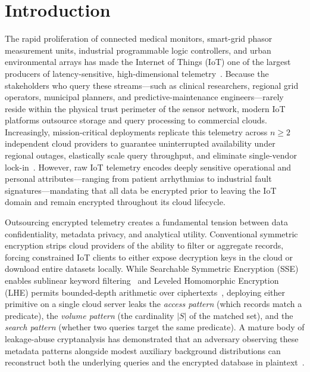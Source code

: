 \documentclass[11pt,a4paper]{article}
\begin{document}
\section{Introduction}

The rapid proliferation of connected medical monitors, smart-grid phasor measurement units, industrial programmable logic controllers, and urban environmental arrays has made the Internet of Things (IoT) one of the largest producers of latency-sensitive, high-dimensional telemetry~\cite{atzori2010}. Because the stakeholders who query these streams---such as clinical researchers, regional grid operators, municipal planners, and predictive-maintenance engineers---rarely reside within the physical trust perimeter of the sensor network, modern IoT platforms outsource storage and query processing to commercial clouds. Increasingly, mission-critical deployments replicate this telemetry across $n \ge 2$ independent cloud providers to guarantee uninterrupted availability under regional outages, elastically scale query throughput, and eliminate single-vendor lock-in~\cite{petcu2013,grozev2014}. However, raw IoT telemetry encodes deeply sensitive operational and personal attributes---ranging from patient arrhythmias to industrial fault signatures---mandating that all data be encrypted prior to leaving the IoT domain and remain encrypted throughout its cloud lifecycle.

Outsourcing encrypted telemetry creates a fundamental tension between data confidentiality, metadata privacy, and analytical utility. Conventional symmetric encryption strips cloud providers of the ability to filter or aggregate records, forcing constrained IoT clients to either expose decryption keys in the cloud or download entire datasets locally. While Searchable Symmetric Encryption (SSE) enables sublinear keyword filtering~\cite{song2000,curtmola2006,islam2023} and Leveled Homomorphic Encryption (LHE) permits bounded-depth arithmetic over ciphertexts~\cite{fan2012,cheon2016}, deploying either primitive on a single cloud server leaks the \textit{access pattern} (which records match a predicate), the \textit{volume pattern} (the cardinality $|S|$ of the matched set), and the \textit{search pattern} (whether two queries target the same predicate). A mature body of leakage-abuse cryptanalysis has demonstrated that an adversary observing these metadata patterns alongside modest auxiliary background distributions can reconstruct both the underlying queries and the encrypted database in plaintext~\cite{islam2012,cash2015,grubbs2017}.
\end{document}
